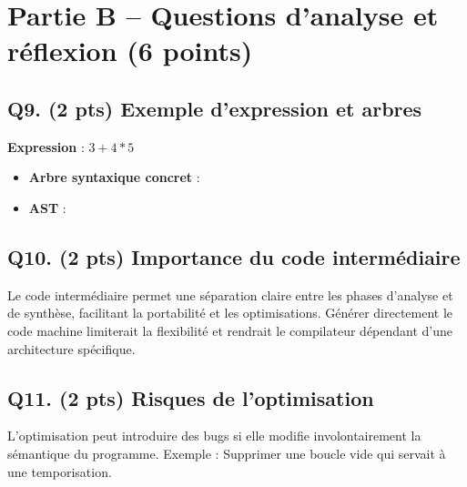 \documentclass[12pt]{article}
\begin{document}
\section*{Partie B – Questions d'analyse et réflexion (6 points)}

\subsection*{Q9. (2 pts) Exemple d'expression et arbres}
\textbf{Expression} : \(3 + 4 * 5\)

\begin{itemize}
    \item \textbf{Arbre syntaxique concret} :

    \item \textbf{AST} :
\end{itemize}

\subsection*{Q10. (2 pts) Importance du code intermédiaire}
Le code intermédiaire permet une séparation claire entre les phases d'analyse et de synthèse, facilitant la portabilité et les optimisations. Générer directement le code machine limiterait la flexibilité et rendrait le compilateur dépendant d'une architecture spécifique.

\subsection*{Q11. (2 pts) Risques de l'optimisation}
L'optimisation peut introduire des bugs si elle modifie involontairement la sémantique du programme. Exemple : Supprimer une boucle vide qui servait à une temporisation.
\end{document}
